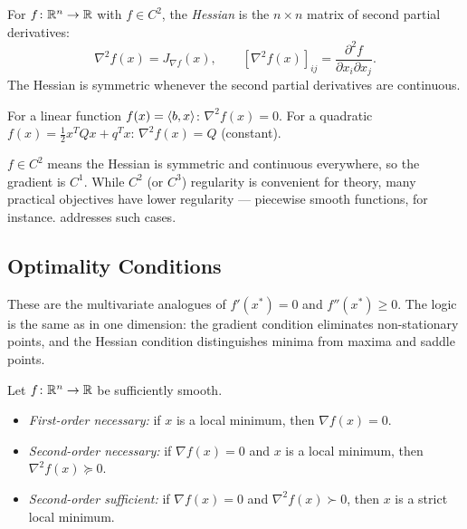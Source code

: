 \begin{defn}[Hessian]\label{def:hessian}
	For $f \colon \mathbb{R}^n \to \mathbb{R}$ with $f \in C^2$, the \textit{Hessian} is the $n \times n$ matrix of second partial derivatives:
	\begin{equation}\label{eq:hessian}
		\nabla^2 f(x) = J_{\nabla f}(x),
		\qquad
		[\nabla^2 f(x)]_{ij} = \frac{\partial^2 f}{\partial x_i \partial x_j}.
	\end{equation}
	The Hessian is symmetric whenever the second partial derivatives are continuous.
\end{defn}

\begin{exm}
	For a linear function $f(x) = \langle b, x\rangle$: $\nabla^2 f(x) = 0$.
	For a quadratic $f(x) = \frac{1}{2} x^T Q x + q^T x$: $\nabla^2 f(x) = Q$ (constant).
\end{exm}

\begin{rem}\label{rem:regularity}
	$f \in C^2$ means the Hessian is symmetric and continuous everywhere, so the gradient is $C^1$.
	While $C^2$ (or $C^3$) regularity is convenient for theory, many practical objectives have lower regularity --- piecewise smooth functions, for instance.
	 addresses such cases.
\end{rem}


\subsection{Optimality Conditions}\label{ssec:optimality-conditions}

These are the multivariate analogues of $f'(x^*) = 0$ and $f''(x^*) \geq 0$.
The logic is the same as in one dimension: the gradient condition eliminates non-stationary points, and the Hessian condition distinguishes minima from maxima and saddle points.

\begin{thm}\label{thm:optimality}
	Let $f \colon \mathbb{R}^n \to \mathbb{R}$ be sufficiently smooth.
	\begin{itemize}
		\item \textit{First-order necessary:} if $x$ is a local minimum, then $\nabla f(x) = 0$.
		\item \textit{Second-order necessary:} if $\nabla f(x) = 0$ and $x$ is a local minimum, then $\nabla^2 f(x) \succeq 0$.
		\item \textit{Second-order sufficient:} if $\nabla f(x) = 0$ and $\nabla^2 f(x) \succ 0$, then $x$ is a strict local minimum.
	\end{itemize}
\end{thm}


